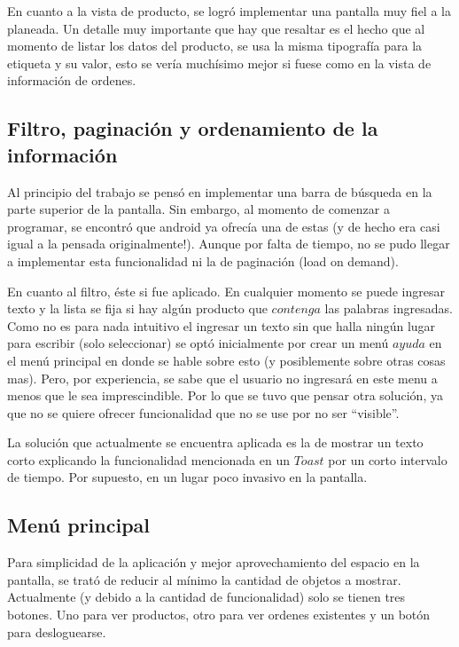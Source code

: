 \documentclass[english]{article}
\begin{document}
En cuanto a la vista de producto, se logró implementar una pantalla
muy fiel a la planeada. Un detalle muy importante que hay que resaltar
es el hecho que al momento de listar los datos del producto, se usa
la misma tipografía para la etiqueta y su valor, esto se vería muchísimo
mejor si fuese como en la vista de información de ordenes.\\



\subsection*{Filtro, paginación y ordenamiento de la información }

Al principio del trabajo se pensó en implementar una barra de búsqueda
en la parte superior de la pantalla. Sin embargo, al momento de comenzar
a programar, se encontró que android ya ofrecía una de estas (y de
hecho era casi igual a la pensada originalmente!). Aunque por falta
de tiempo, no se pudo llegar a implementar esta funcionalidad ni la
de paginación (load on demand).

En cuanto al filtro, éste si fue aplicado. En cualquier momento se
puede ingresar texto y la lista se fija si hay algún producto que
$contenga$ las palabras ingresadas. Como no es para nada intuitivo
el ingresar un texto sin que halla ningún lugar para escribir (solo
seleccionar) se optó inicialmente por crear un menú $ayuda$ en el
menú principal en donde se hable sobre esto (y posiblemente sobre
otras cosas mas). Pero, por experiencia, se sabe que el usuario no
ingresará en este menu a menos que le sea imprescindible. Por lo que
se tuvo que pensar otra solución, ya que no se quiere ofrecer funcionalidad
que no se use por no ser {}``visible''.

La solución que actualmente se encuentra aplicada es la de mostrar
un texto corto explicando la funcionalidad mencionada en un $Toast$
por un corto intervalo de tiempo. Por supuesto, en un lugar poco invasivo
en la pantalla.\\



\subsection*{Menú principal}

Para simplicidad de la aplicación y mejor aprovechamiento del espacio
en la pantalla, se trató de reducir al mínimo la cantidad de objetos
a mostrar. Actualmente (y debido a la cantidad de funcionalidad) solo
se tienen tres botones. Uno para ver productos, otro para ver ordenes
existentes y un botón para desloguearse.
\end{document}
